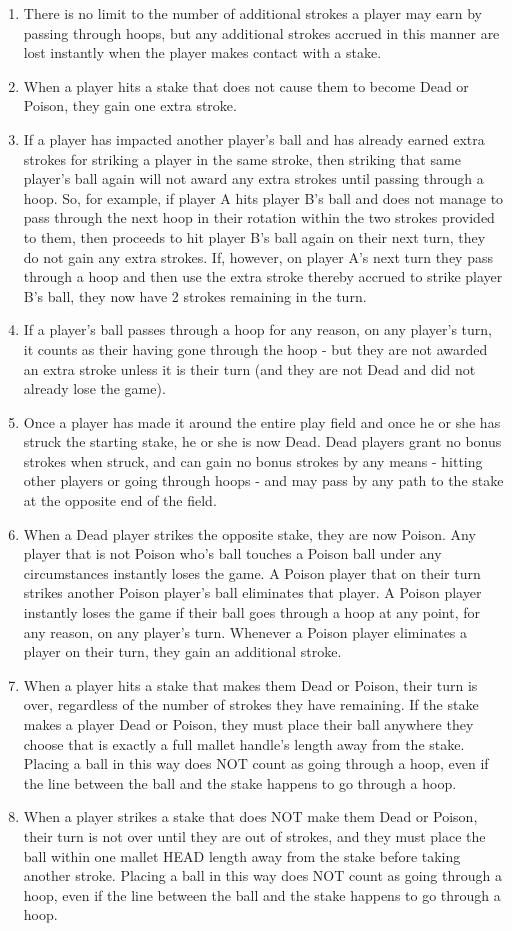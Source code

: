 \documentclass[a4paper]{article}
\begin{document}
\begin{enumerate}
\item There is no limit to the number of additional strokes a player may earn by passing through hoops, but any additional strokes accrued in this manner are lost instantly when the player makes contact with a stake.
\item When a player hits a stake that does not cause them to become Dead or Poison, they gain one extra stroke.
\item If a player has impacted another player's ball and has already earned extra strokes for striking a player in the same stroke, then striking that same player's ball again will not award any extra strokes until passing through a hoop. So, for example, if player A hits player B's ball and does not manage to pass through the next hoop in their rotation within the two strokes provided to them, then proceeds to hit player B's ball again on their next turn, they do not gain any extra strokes. If, however, on player A's next turn they pass through a hoop and then use the extra stroke thereby accrued to strike player B's ball, they now have 2 strokes remaining in the turn.
\item If a player's ball passes through a hoop for any reason, on any player's turn, it counts as their having gone through the hoop - but they are not awarded an extra stroke unless it is their turn (and they are not Dead and did not already lose the game).
\item Once a player has made it around the entire play field and once he or she has struck the starting stake, he or she is now Dead. Dead players grant no bonus strokes when struck, and can gain no bonus strokes by any means - hitting other players or going through hoops - and may pass by any path to the stake at the opposite end of the field.
\item When a Dead player strikes the opposite stake, they are now Poison. Any player that is not Poison who's ball touches a Poison ball under any circumstances instantly loses the game. A Poison player that on their turn strikes another Poison player's ball eliminates that player. A Poison player instantly loses the game if their ball goes through a hoop at any point, for any reason, on any player's turn. Whenever a Poison player eliminates a player on their turn, they gain an additional stroke.
\item When a player hits a stake that makes them Dead or Poison, their turn is over, regardless of the number of strokes they have remaining. If the stake makes a player Dead or Poison, they must place their ball anywhere they choose that is exactly a full mallet handle's length away from the stake. Placing a ball in this way does NOT count as going through a hoop, even if the line between the ball and the stake happens to go through a hoop.
\item When a player strikes a stake that does NOT make them Dead or Poison, their turn is not over until they are out of strokes, and they must place the ball within one mallet HEAD length away from the stake before taking another stroke. Placing a ball in this way does NOT count as going through a hoop, even if the line between the ball and the stake happens to go through a hoop.
\end{enumerate}
\end{document}
